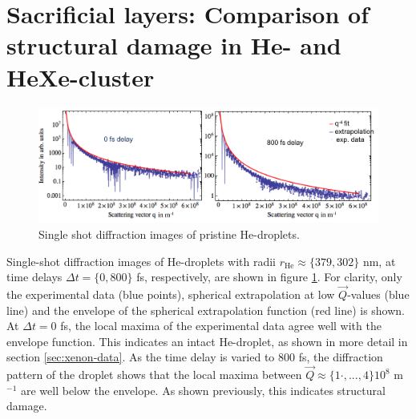 \section{Sacrificial layers: Comparison of structural damage in He- and HeXe-cluster}\label{sec:comparison-of-He-and-HeXe-cluster}
\begin{figure}
	\centering
		\includegraphics[width=1.00\textwidth]{images/results/He-diffraction-patterns.png}
	\caption[Single-shot diffraction images of He-droplets at different time delays]{Single shot diffraction images of pristine He-droplets.}
	\label{fig:He-diffraction-patterns}
\end{figure}
Single-shot diffraction images of He-droplets with radii $r_{\text{He}}\approx\{379, 302\}$ nm, at time delays $\Delta t=\{0, 800\}$ fs, respectively, are shown in figure \ref{fig:He-diffraction-patterns}. For clarity, only the experimental data (blue points), spherical extrapolation at low $\vec{Q}$-values (blue line) and the envelope of the spherical extrapolation function (red line) is shown. At $\Delta t = 0$ fs, the local maxima of the experimental data agree well with the envelope function. This indicates an intact He-droplet, as shown in more detail in section \ref{sec:xenon-data}. As the time delay is varied to $800$ fs, the diffraction pattern of the droplet shows that the local maxima between $\vec{Q} \approx \{1\cdot,...,4\}10^{8}$ m$^{-1}$ are well below the envelope. As shown previously, this indicates structural damage.\\
